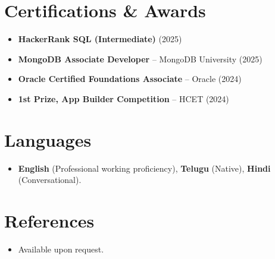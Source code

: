 \documentclass[11pt,a4paper,sans]{moderncv}
\begin{document}

\section{Certifications \& Awards}
\vspace{1pt}
\begin{itemize}
\item \textbf{HackerRank SQL (Intermediate)} (2025)
\item \textbf{MongoDB Associate Developer} -- MongoDB University (2025)
\item \textbf{Oracle Certified Foundations Associate} -- Oracle (2024)
\item \textbf{1st Prize, App Builder Competition} -- HCET (2024)
\end{itemize}


\section{Languages}
\vspace{1pt}
\begin{itemize}
\item \textbf{English} (Professional working proficiency), \textbf{Telugu} (Native), \textbf{Hindi} (Conversational).
\end{itemize}


\section{References}
\vspace{1pt}
\begin{itemize}
\item Available upon request.
\end{itemize}
\end{document}

